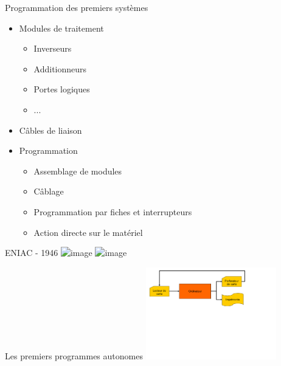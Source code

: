 \begin{frame}{Programmation des premiers systèmes}
\begin{itemize}
\item Modules de traitement
\begin{itemize}
\item Inverseurs
\item Additionneurs
\item Portes logiques
\item ...
\end{itemize}
\item Câbles de liaison
\item<2> Programmation
\begin{itemize}
\item Assemblage de modules
\item Câblage
\item Programmation par fiches et interrupteurs
\item Action directe sur le matériel
\end{itemize}
\end{itemize}
\end{frame}

\begin{frame}{ENIAC - 1946}
\includegraphics<1>[height=4.5cm]{../illustration/eniac1.png}
\includegraphics<2>[height=4.5cm]{../illustration/eniac2.png}
\end{frame}


\begin{frame}{Les premiers programmes autonomes}
\includegraphics[height=4cm]{../illustration/pgm_autonome.pdf}
\end{frame}


